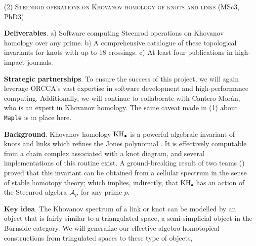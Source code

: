 
\smallskip
{\centering (2) \textsc{Steenrod operations on Khovanov homology of knots and links} (MSc3, PhD3)\par}

\smallskip\textbf{Deliverables}.
a) Software computing Steenrod operations on Khovanov homology over any prime.
b) A comprehensive catalogue of these topological invariants for knots with up to 18 crossings.
c) At least four publications in high-impact journals.

\smallskip\textbf{Strategic partnerships}.
To ensure the success of this project, we will again leverage ORCCA's vast expertise in software development and high-performance computing.
Additionally, we will continue to collaborate with Cantero-Mor\'an, who is an expert in Khovanov homology.
The same caveat made in (1) about \texttt{Maple} is in place here.

\smallskip\textbf{Background}.
Khovanov homology $\mathrm{KH}_\bullet$ is a powerful algebraic invariant of knots and links which refines the Jones polynomial \cite{khovanov2000khovanov}.
It is effectively computable from a chain complex associated with a knot diagram, and several implementations of this routine exist.
A ground-breaking result of two teams (\cite{lipshitz2014khovanov,kriz2016khovanov}) proved that this invariant can be obtained from a cellular spectrum in the sense of stable homotopy theory; which implies, indirectly, that $\mathrm{KH_\bullet}$ has an action of the Steenrod algebra $\mathcal{A}_p$ for any prime $p$.

\smallskip\textbf{Key idea}.
The Khovanov spectrum of a link or knot can be modelled by an object that is fairly similar to a triangulated space, a semi-simplicial object in the Burnside category.
We will generalize our effective algebro-homotopical constructions from tringulated spaces to these type of objects,

